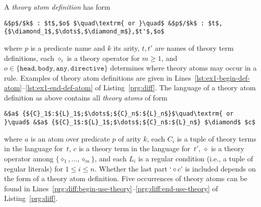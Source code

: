 A \emph{theory atom definition} has form
\begin{lstlisting}[numbers=none,mathescape=t]
&$p$/$k$ : $t$,$o$ $\quad\textrm{ or }\quad$ &$p$/$k$ : $t$,{$\diamond_1$,$\dots$,$\diamond_m$},$t'$,$o$
\end{lstlisting}
where $p$ is a predicate name and $k$ its arity,
$t,t'$ are names of theory term definitions,
each $\diamond_i$ is a theory operator for $m\geq 1$,
and
\(
o\in\{\mathtt{head},\mathtt{body},\mathtt{any}, \mathtt{directive}\}
\)
determines where theory atoms may occur in a rule.
%
Examples of theory atom definitions are given in Lines~\ref{lst:ex1-begin-def-atom}--\ref{lst:ex1-end-def-atom} of Listing~\ref{prg:diff}.
The language of a theory atom definition as above contains all \emph{theory atoms} of form
\begin{lstlisting}[numbers=none,mathescape=t]
&$a$ {${C}_1$:${L}_1$;$\dots$;${C}_n$:${L}_n$}$\quad\textrm{ or }\quad$ &$a$ {${C}_1$:${L}_1$;$\dots$;${C}_n$:${L}_n$} $\diamond$ $c$
\end{lstlisting}
where $a$ is an atom over predicate $p$ of arity $k$,
each ${C}_i$ is a tuple of theory terms in the language for~$t$,
$c$ is a theory term in the language for~$t'$,
$\diamond$ is a theory operator among $\{ \diamond_1, \dots, \diamond_m \}$,
and each ${L}_i$ is a regular condition (i.e., a tuple of regular literals)
for $1\leq i\leq n$.
Whether the last part `${}\diamond c$' is included depends on the form of a theory atom definition.
%
Five occurrences of theory atoms can be found in Lines~\ref{prg:diff:begin-use-theory}--\ref{prg:diff:end-use-theory} of Listing~\ref{prg:diff}.

